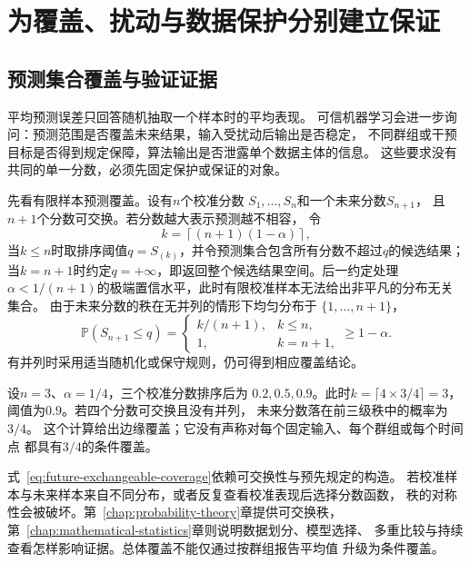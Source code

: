 \section{为覆盖、扰动与数据保护分别建立保证}
\label{sec:future-trustworthy-machine-learning}

\subsection{预测集合覆盖与验证证据}
\label{sec:future-prediction-error-coverage-evidence}

平均预测误差只回答随机抽取一个样本时的平均表现。
可信机器学习会进一步询问：预测范围是否覆盖未来结果，输入受扰动后输出是否稳定，
不同群组或干预目标是否得到规定保障，算法输出是否泄露单个数据主体的信息。
这些要求没有共同的单一分数，必须先固定保护或保证的对象。

先看有限样本预测覆盖。设有$n$个校准分数
$S_1,\ldots,S_n$和一个未来分数$S_{n+1}$，
且$n+1$个分数可交换。若分数越大表示预测越不相容，
令
\[
  k=\left\lceil(n+1)(1-\alpha)\right\rceil,
\]
当$k\leq n$时取排序阈值$q=S_{(k)}$，并令预测集合包含所有分数不超过$q$的候选结果；
当$k=n+1$时约定$q=+\infty$，即返回整个候选结果空间。后一约定处理
$\alpha<1/(n+1)$的极端置信水平，此时有限校准样本无法给出非平凡的分布无关集合。
由于未来分数的秩在无并列的情形下均匀分布于
$\{1,\ldots,n+1\}$，
\begin{equation}
  \mathbb{P}(S_{n+1}\leq q)
  =
  \begin{cases}
    k/(n+1), & k\leq n,\\
    1, & k=n+1,
  \end{cases}
  \geq
  1-\alpha.
  \label{eq:future-exchangeable-coverage}
\end{equation}
有并列时采用适当随机化或保守规则，仍可得到相应覆盖结论。

\begin{example}[四个可交换分数的秩]
  \label{ex:future-conformal-rank}
  设$n=3$、$\alpha=1/4$，三个校准分数排序后为
  $0.2,0.5,0.9$。此时$k=\lceil4\times3/4\rceil=3$，
  阈值为$0.9$。若四个分数可交换且没有并列，
  未来分数落在前三级秩中的概率为$3/4$。
  这个计算给出边缘覆盖；它没有声称对每个固定输入、每个群组或每个时间点
  都具有$3/4$的条件覆盖。
\end{example}

式~\eqref{eq:future-exchangeable-coverage}依赖可交换性与预先规定的构造。
若校准样本与未来样本来自不同分布，或者反复查看校准表现后选择分数函数，
秩的对称性会被破坏。第~\ref{chap:probability-theory}章提供可交换秩，
第~\ref{chap:mathematical-statistics}章则说明数据划分、模型选择、
多重比较与持续查看怎样影响证据。总体覆盖不能仅通过按群组报告平均值
升级为条件覆盖。

